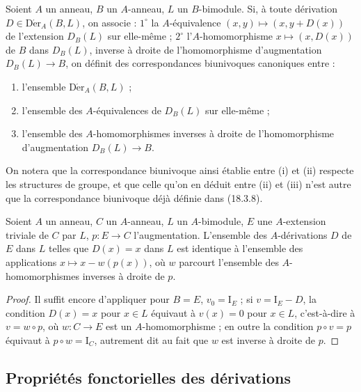 \begin{corollary}[20.1.6]
\label{0.20.1.6-fr}
Soient $A$ un anneau, $B$ un $A$-anneau, $L$ un $B$-bimodule. Si, à toute
dérivation $D\in\operatorname{D\acute{e}r}_A(B,L)$, on associe : $1^\circ$ la
$A$-équivalence $(x,y)\mapsto(x,y+D(x))$ de l'extension $D_B(L)$ sur
elle-même ; $2^\circ$ l'$A$-homomorphisme $x\mapsto(x,D(x))$ de $B$ dans
$D_B(L)$, inverse à droite de l'homomorphisme d'augmentation $D_B(L)\to B$,
on définit des correspondances biunivoques canoniques entre :
\begin{enumerate}
  \item[\rm(i)] l'ensemble $\operatorname{D\acute{e}r}_A(B,L)$ ;
  \item[\rm(ii)] l'ensemble des $A$-équivalences de $D_B(L)$ sur elle-même ;
  \item[\rm(iii)] l'ensemble des $A$-homomorphismes inverses à droite de
  l'homomorphisme d'augmentation $D_B(L)\to B$.
\end{enumerate}
\end{corollary}

On notera que la correspondance biunivoque ainsi établie entre (i) et (ii)
respecte les structures de groupe, et que celle qu'on en déduit entre (ii) et
(iii) n'est autre que la correspondance biunivoque déjà définie dans (18.3.8).

\begin{corollary}[20.1.7]
\label{0.20.1.7-fr}
Soient $A$ un anneau, $C$ un $A$-anneau, $L$ un $A$-bimodule, $E$ une
$A$-extension triviale de $C$ par $L$, $p:E\to C$ l'augmentation. L'ensemble
des $A$-dérivations $D$ de $E$ dans $L$ telles que $D(x)=x$ dans $L$ est
identique à l'ensemble des applications $x\mapsto x-w(p(x))$, où $w$
parcourt l'ensemble des $A$-homomorphismes inverses à droite de $p$.
\end{corollary}

\begin{proof}
Il suffit encore d'appliquer  pour $B=E$,
$v_0=\mathrm{I}_E$ ; si $v=\mathrm{I}_E-D$, la condition $D(x)=x$ pour
$x\in L$ équivaut à $v(x)=0$ pour $x\in L$, c'est-à-dire à $v=w\circ p$,
où $w:C\to E$ est un $A$-homomorphisme ; en outre la condition
$p\circ v=p$ équivaut à $p\circ w=\mathrm{I}_C$, autrement dit au fait que
$w$ est inverse à droite de $p$.
\end{proof}

\subsection{Propriétés fonctorielles des dérivations}
\label{subsection:0.20.2-fr}

